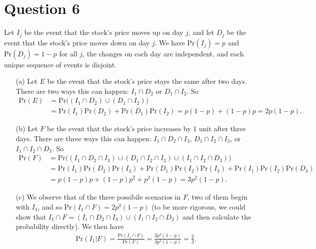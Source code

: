 \documentclass[10pt]{article}
\begin{document}
\section{Question 6} \noindent
Let \(I_j\) be the event that the stock's price moves up on day \(j\), and let \(D_j\) be the event that the stock's price moves down on day \(j\). 
We have \(\mathrm{Pr}(I_j) = p\) and \(\mathrm{Pr}(D_j) = 1 - p\) for all \(j\), the changes on each day are independent, and each unique sequence of 
events is disjoint. 
\begin{itemize}
    \item[(a)] Let \(E\) be the event that the stock's price stays the same after two days. There are two ways this can happen: \(I_1 \cap D_2\) or 
    \(D_1 \cap I_2\). So 
    \begin{align*}
        \mathrm{Pr}(E) &= \mathrm{Pr} \Big( (I_1 \cap D_2) \cup (D_1 \cap I_2) \Big) \\
        &= \mathrm{Pr}(I_1)\mathrm{Pr}(D_2) + \mathrm{Pr}(D_1) \mathrm{Pr}(I_2) 
        = p(1-p) + (1-p)p = 2p(1-p).
    \end{align*}
    \item[(b)] Let \(F\) be the event that the stock's price increases by 1 unit after three days. There are three ways this can happen: \(I_1 \cap D_2 \cap I_3\), 
    \(D_1 \cap I_2 \cap I_3\), or \(I_1 \cap I_2 \cap D_3\). So 
    \begin{align*}
        \mathrm{Pr}(F) &= \mathrm{Pr} \Big( (I_1 \cap D_2 \cap I_3) \cup (D_1 \cap I_2 \cap I_3) \cup (I_1 \cap I_2 \cap D_3) \Big) \\
        &= \mathrm{Pr}(I_1)\mathrm{Pr}(D_2)\mathrm{Pr}(I_3) + \mathrm{Pr}(D_1)\mathrm{Pr}(I_2)\mathrm{Pr}(I_3) + \mathrm{Pr}(I_1)\mathrm{Pr}(I_2)\mathrm{Pr}(D_3) \\
        &= p(1-p)p + (1-p)p^2 + p^2 (1-p) = 3p^2(1-p).
    \end{align*}
    \item[(c)] %
    We observe that of the three possibile scenarios in \(F\), two of them begin with \(I_1\), and so \(\mathrm{Pr}(I_1 \cap F) = 2 p^2 (1-p)\) (to be
    more rigorous, we could show that \(I_1 \cap F = 
    (I_1 \cap D_2 \cap I_3) \cup (I_1 \cap I_2 \cap D_3)\) and then calculate the probability directly). We then have 
    \begin{align*}
        \mathrm{Pr}(I_1 | F) = \frac{\mathrm{Pr}(I_1 \cap F)}{\mathrm{Pr}(F)} = \frac{2 p^2 (1-p)}{3 p^2 (1-p)} = \frac{2}{3}.
    \end{align*}
\end{itemize}
\end{document}
